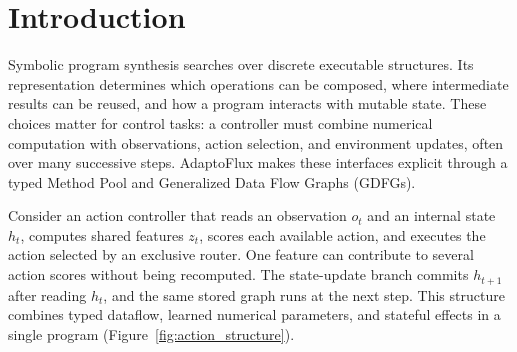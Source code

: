 \begin{abstract}
AdaptoFlux is a typed graph substrate for constructing and reusing stateful symbolic programs. It separates editable program graphs from an extensible method pool: declared types guide candidate connections, constructed subgraphs can be registered for subsequent composition, and zero-output action nodes participate in execution without a path to the numerical output. External state connects successive graph executions. Search procedures propose graph structures and method choices; optimized numerical parameters can also be embedded in the resulting programs. Experiments examine semantic type priors, module reuse, execution scale, and integration with an existing graph system. On the studied stateful synthesis task, fine-grained, role-merged, and all-scalar declarations achieve success in 29/30, 15/30, and 1/30 runs. Execution measurements cover up to 1,024 operation nodes. A comparison with PyTensor completes the same discover--register--reuse workflow and reproduces four frozen action controllers over 21,200 steps, with identical actions and zero differences in features, scores, and memory. Controlled search separately identifies benefits of a shared module-reuse policy. An optional resource-ordering mechanism supports consistent shared-state execution. These results characterize concrete interfaces for program modification, reusable computational structure, and stateful interaction.
\end{abstract}

\section{Introduction}
\label{sec:introduction}
Symbolic program synthesis searches over discrete executable structures. Its representation determines which operations can be composed, where intermediate results can be reused, and how a program interacts with mutable state. These choices matter for control tasks: a controller must combine numerical computation with observations, action selection, and environment updates, often over many successive steps. AdaptoFlux makes these interfaces explicit through a typed Method Pool and Generalized Data Flow Graphs (GDFGs).

Consider an action controller that reads an observation $o_t$ and an internal state $h_t$, computes shared features $z_t$, scores each available action, and executes the action selected by an exclusive router. One feature can contribute to several action scores without being recomputed. The state-update branch commits $h_{t+1}$ after reading $h_t$, and the same stored graph runs at the next step. This structure combines typed dataflow, learned numerical parameters, and stateful effects in a single program (Figure~\ref{fig:action_structure}).

